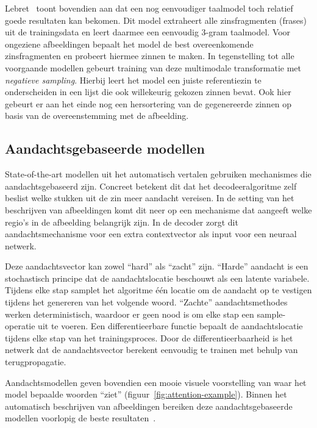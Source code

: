 Lebret~\cite{Lebret2015} toont bovendien aan dat een nog eenvoudiger taalmodel toch relatief goede resultaten kan bekomen. Dit model extraheert alle zinsfragmenten (frases) uit de trainingsdata en leert daarmee een eenvoudig 3-gram taalmodel. Voor ongeziene afbeeldingen bepaalt het model de best overeenkomende zinsfragmenten en probeert hiermee zinnen te maken. In tegenstelling tot alle voorgaande modellen gebeurt training van deze multimodale transformatie met \emph{negatieve sampling}. Hierbij leert het model een juiste referentiezin te onderscheiden in een lijst die ook willekeurig gekozen zinnen bevat. Ook hier gebeurt er aan het einde nog een hersortering van de gegenereerde zinnen op basis van de overeenstemming met de afbeelding.

\subsection{Aandachtsgebaseerde modellen}
State-of-the-art modellen uit het automatisch vertalen gebruiken mechanismes die aandachtsgebaseerd zijn. Concreet betekent dit dat het decodeeralgoritme zelf beslist welke stukken uit de zin meer aandacht vereisen.
In de setting van het beschrijven van afbeeldingen komt dit neer op een mechanisme dat aangeeft welke regio's in de afbeelding belangrijk zijn. In de decoder zorgt dit aandachtsmechanisme voor een extra contextvector als input voor een neuraal netwerk. 

Deze aandachtsvector kan zowel ``hard'' als ``zacht'' zijn. ``Harde'' aandacht is een stochastisch principe dat de aandachtslocatie beschouwt als een latente variabele. Tijdens elke stap samplet het algoritme \'e\'en locatie om de aandacht op te vestigen tijdens het genereren van het volgende woord. ``Zachte'' aandachtsmethodes werken deterministisch, waardoor er geen nood is om elke stap een sample-operatie uit te voeren. Een differentieerbare functie bepaalt de aandachtslocatie tijdens elke stap van het trainingsproces. Door de differentieerbaarheid is het netwerk dat de aandachtsvector berekent eenvoudig te trainen met behulp van terugpropagatie.

Aandachtsmodellen geven bovendien een mooie visuele voorstelling van waar het model bepaalde woorden ``ziet'' (figuur~\ref{fig:attention-example}). Binnen het automatisch beschrijven van afbeeldingen bereiken deze aandachtsgebaseerde modellen voorlopig de beste resultaten~\cite{Jin2015,Xu2015}.

